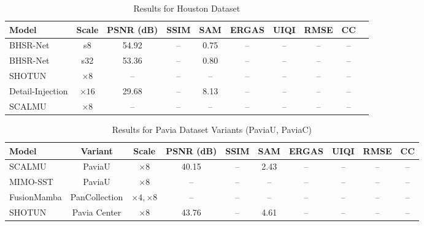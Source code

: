 \documentclass[conference]{IEEEtran}
\begin{document}
\begin{table}[htbp]
\caption{Results for Houston Dataset \cite{houston_dataset}}
\begin{center}
\begin{adjustbox}{width=\textwidth}
\begin{tabular}{lccccccccc}
\toprule
\textbf{Model} & \textbf{Scale} & \textbf{PSNR (dB)} & \textbf{SSIM} & \textbf{SAM} & \textbf{ERGAS} & \textbf{UIQI} & \textbf{RMSE} & \textbf{CC} \\
\midrule
BHSR-Net \cite{dou2026bhsrnet} & s8 & 54.92 & -- & 0.75 & -- & -- & -- & -- \\
BHSR-Net \cite{dou2026bhsrnet} & s32 & 53.36 & -- & 0.80 & -- & -- & -- & -- \\
SHOTUN \cite{wang2026shotun} & $\times 8$ & -- & -- & -- & -- & -- & -- & -- \\
Detail-Injection \cite{fang2026detail} & $\times 16$ & 29.68 & -- & 8.13 & -- & -- & -- & -- \\
SCALMU \cite{xu2026scalmu} & $\times 8$ & -- & -- & -- & -- & -- & -- & -- \\
\bottomrule
\end{tabular}
\end{adjustbox}
\label{tab:houston}
\end{center}
\end{table}

\begin{table}[htbp]
\caption{Results for Pavia Dataset Variants (PaviaU, PaviaC) \cite{hyperpancollection}}
\begin{center}
\begin{adjustbox}{width=\textwidth}
\begin{tabular}{lccccccccc}
\toprule
\textbf{Model} & \textbf{Variant} & \textbf{Scale} & \textbf{PSNR (dB)} & \textbf{SSIM} & \textbf{SAM} & \textbf{ERGAS} & \textbf{UIQI} & \textbf{RMSE} & \textbf{CC} \\
\midrule
SCALMU \cite{xu2026scalmu} & PaviaU & $\times 8$ & 40.15 & -- & 2.43 & -- & -- & -- & -- \\
MIMO-SST \cite{fang2024mimosst} & PaviaU & $\times 8$ & -- & -- & -- & -- & -- & -- & -- \\
FusionMamba \cite{peng2024fusionmamba} & PanCollection & $\times 4, \times 8$ & -- & -- & -- & -- & -- & -- & -- \\
SHOTUN \cite{wang2026shotun} & Pavia Center & $\times 8$ & 43.76 & -- & 4.61 & -- & -- & -- & -- \\
\bottomrule
\end{tabular}
\end{adjustbox}
\label{tab:pavia}
\end{center}
\end{table}
\end{document}
